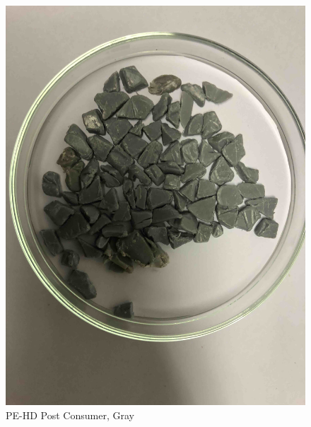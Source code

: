 \begin{appendices}
\begin{figure}
    \centering
    \includegraphics[width = 12cm]{Images/appendix/PE-Regrind-(Post-Consumer)-gray.jpg}
    \caption{PE-HD Post Consumer, Gray}
    \label{fig:pehd-gray}
\end{figure}


\end{appendices}

